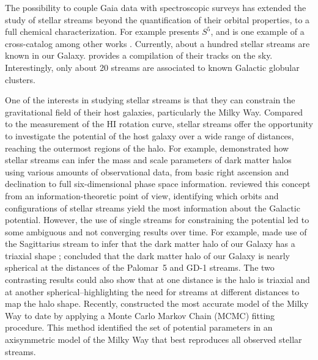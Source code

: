 \documentclass[draft]{aa}
\begin{document}
  The possibility to couple Gaia data with spectroscopic surveys has extended the study of stellar streams beyond the quantification of their orbital properties, to a full chemical characterization. For example \citet{2019MNRAS.490.3508L} presents $S^5$, and is one example of a cross-catalog among other works \citep{2020AJ....160..181J, 2021ApJ...911..149L, 2022ApJ...928...30L, 2024MNRAS.529.2413U}. Currently, about a hundred stellar streams are known in our Galaxy. \citet{2023MNRAS.520.5225M} provides a compilation of their tracks on the sky. Interestingly, only about 20 streams are associated to known Galactic globular clusters.

  One of the interests in studying stellar streams is that they can constrain the gravitational field of their host galaxies, particularly the Milky Way. Compared to the measurement of the HI rotation curve, stellar streams offer the opportunity to investigate the potential of the host galaxy over a wide range of distances, reaching the outermost regions of the halo. For example, \citet{2011MNRAS.417..198V} demonstrated how stellar streams can infer the mass and scale parameters of dark matter halos using various amounts of observational data, from basic right ascension and declination to full six-dimensional phase space information. \citet{2018ApJ...867..101B} reviewed this concept from an information-theoretic point of view, identifying which orbits and configurations of stellar streams yield the most information about the Galactic potential. However, the use of single streams for constraining the potential led to some ambiguous and not converging results over time. For example, \citet{2010ApJ...718.1128L} made use of the Sagittarius stream to infer that the dark matter halo of our Galaxy has a triaxial shape \citep[but see also][]{2004MNRAS.351..643H, 2005ApJ...619..800J, 2005ApJ...619..807L}; \citet{2016ApJ...833...31B} concluded that the dark matter halo of our Galaxy is nearly spherical at the distances of the Palomar~5 and GD-1 streams. The two contrasting results could also show that at one distance is the halo is triaxial and at another spherical--highlighting the need for streams at different distances to map the halo shape. Recently, \citet{2024ApJ...967...89I} constructed the most accurate model of the Milky Way to date by applying a Monte Carlo Markov Chain (MCMC) fitting procedure. This method identified the set of potential parameters in an axisymmetric model of the Milky Way that best reproduces all observed stellar streams.
\end{document}
